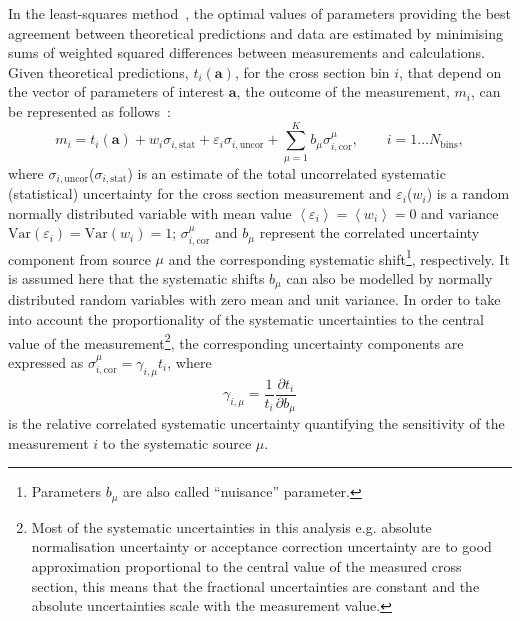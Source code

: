 In the least-squares method~\cite{Behnke:2013pga}, the optimal values of parameters providing the best agreement between theoretical predictions and data are estimated by minimising sums of weighted squared differences between measurements and calculations. Given theoretical predictions, $t_i\left( \mathbf{a} \right)$, for the cross section bin $i$, that depend on the vector of parameters of interest $\mathbf{a}$, the outcome of the measurement, $m_i$, can be represented as follows~\cite{Stump:2001gu,Botje:2001fx}:
\begin{equation}
 m_i = t_i\left( \mathbf{a} \right) + w_{i}\sigma_{i,\text{stat}} + \varepsilon_{i} \sigma_{i,\text{uncor}} + \sum_{\mu=1}^{K}{b_{\mu}\sigma_{i,\text{cor}}^\mu}, \qquad i=1\ldots N_\text{bins},
\label{eq:measmodel}
\end{equation}
where $\sigma_{i,\text{uncor}}$($\sigma_{i,\text{stat}}$) is an estimate of the total uncorrelated systematic (statistical) uncertainty for the cross section measurement and $\varepsilon_{i}$($w_{i}$)  is a random normally distributed variable with mean value $\left\langle \varepsilon_{i}\right\rangle = \left\langle w_{i} \right\rangle = 0$ and variance $\text{Var}\left( \varepsilon_{i}\right) = \text{Var}\left( w_{i}\right)  = 1$; $\sigma_{i,\text{cor}}^\mu$ and $b_{\mu}$ represent the correlated uncertainty component from source $\mu$ and the corresponding systematic shift\footnote{Parameters $b_\mu$ are also called ``nuisance'' parameter.}, respectively. It is assumed here that the systematic shifts $b_{\mu}$ can also be modelled by normally distributed random variables with zero mean and unit variance. In order to take into account the proportionality of the systematic uncertainties to the central value of the measurement\footnote{Most of the systematic uncertainties in this analysis e.g. absolute normalisation uncertainty or acceptance correction uncertainty are to good approximation proportional to the central value of the measured cross section, this means that the fractional uncertainties are constant and the absolute uncertainties scale with the measurement value.}, the corresponding uncertainty components are expressed as $\sigma_{i,\text{cor}}^\mu = \gamma_{i,\mu}t_i$, where 
\begin{equation}
\gamma_{i,\mu}=\frac{1}{{t_i}} \frac{\partial t_i}{\partial b_{\mu}}
\end{equation}
is the relative correlated systematic uncertainty quantifying the sensitivity of the measurement $i$ to the systematic source $\mu$. 


